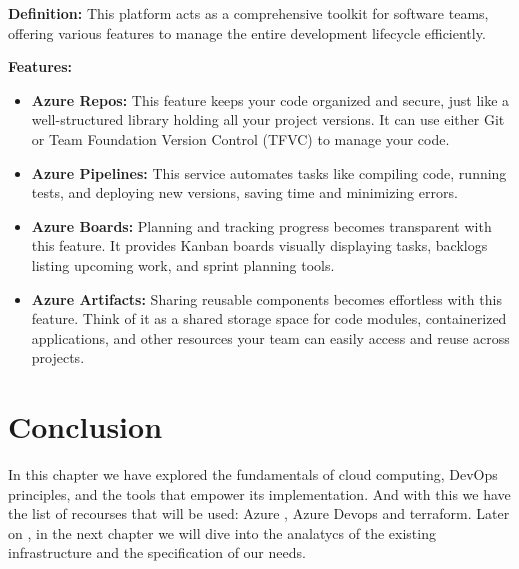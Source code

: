 \textbf{Definition:} This platform acts as a comprehensive toolkit for software teams, offering various features to manage the entire development lifecycle efficiently.
\par
\textbf{Features:}
\begin{itemize}
    \item \textbf{Azure Repos:} This feature keeps your code organized and secure, just like a well-structured library holding all your project versions. It can use either Git or Team Foundation Version Control (TFVC) to manage your code.
    \item \textbf{Azure Pipelines:}  This service automates tasks like compiling code, running tests, and deploying new versions, saving time and minimizing errors.
    \item \textbf{Azure Boards:} Planning and tracking progress becomes transparent with this feature. It provides Kanban boards visually displaying tasks, backlogs listing upcoming work, and sprint planning tools.
    \item \textbf{Azure Artifacts:} Sharing reusable components becomes effortless with this feature. Think of it as a shared storage space for code modules, containerized applications, and other resources your team can easily access and reuse across projects.
\end{itemize}

\section*{Conclusion}
In this chapter we have explored the fundamentals of cloud computing, DevOps principles, and the tools that empower its implementation. And with this we have the list of recourses that will be used: Azure , Azure Devops and terraform. Later on , in the next chapter we will dive into the analatycs of the existing infrastructure and the specification of our needs.
